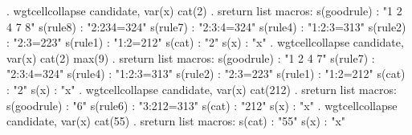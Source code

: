 . wgtcellcollapse candidate, var(x) cat(2)
{\smallskip}
. sreturn list
{\smallskip}
macros:
           s(goodrule) : "1 2 4 7 8"
              s(rule8) : "2:234=324"
              s(rule7) : "2:3:4=324"
              s(rule4) : "1:2:3=313"
              s(rule2) : "2:3=223"
              s(rule1) : "1:2=212"
                s(cat) : "2"
                  s(x) : "x"
{\smallskip}
. wgtcellcollapse candidate, var(x) cat(2) max(9)
{\smallskip}
. sreturn list
{\smallskip}
macros:
           s(goodrule) : "1 2 4 7"
              s(rule7) : "2:3:4=324"
              s(rule4) : "1:2:3=313"
              s(rule2) : "2:3=223"
              s(rule1) : "1:2=212"
                s(cat) : "2"
                  s(x) : "x"
{\smallskip}
. wgtcellcollapse candidate, var(x) cat(212)
{\smallskip}
. sreturn list
{\smallskip}
macros:
           s(goodrule) : "6"
              s(rule6) : "3:212=313"
                s(cat) : "212"
                  s(x) : "x"
{\smallskip}
. wgtcellcollapse candidate, var(x) cat(55)
{\smallskip}
. sreturn list
{\smallskip}
macros:
                s(cat) : "55"
                  s(x) : "x"

